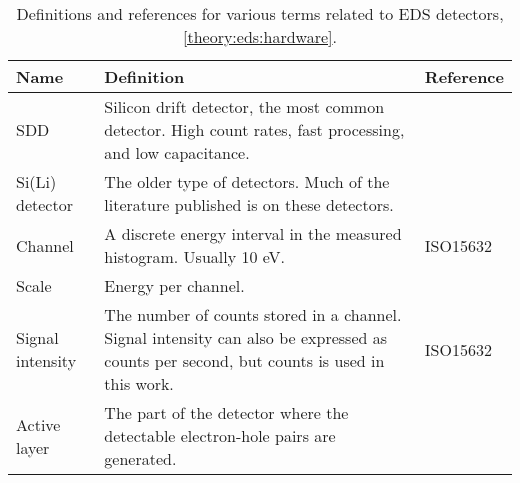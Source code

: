 \begin{table}[pht]
    \begin{center}
        \caption{Definitions and references for various terms related to EDS detectors, \cref{theory:eds:hardware}.}
        \renewcommand*{\arraystretch}{1.4}
        \label{tab:eds:hardware}
        \begin{tabular}{lp{10cm}l}

            \hline
            \textbf{Name}          & \textbf{Definition}                                                                                                                                                                                                    & \textbf{Reference} \\
            \hline
            SDD                    & Silicon drift detector, the most common detector. High count rates, fast processing, and low capacitance.                                                                                                              &                    \\
            Si(Li) detector        & The older type of detectors. Much of the literature published is on these detectors.                                                                                                                                   &                    \\
            Channel                & A discrete energy interval in the measured histogram. Usually 10 eV.                                                                                                                                                   & ISO15632           \\
            Scale                  & Energy per channel.                                                                                                                                                                                                    &                    \\
            Signal intensity       & The number of counts stored in a channel. Signal intensity can also be expressed as counts per second, but counts is used in this work.                                                                                & ISO15632           \\
            Active layer           & The part of the detector where the detectable electron-hole pairs are generated.                                                                                                                                       &                    \\

\end{tabular}
\end{center}
\end{table}
